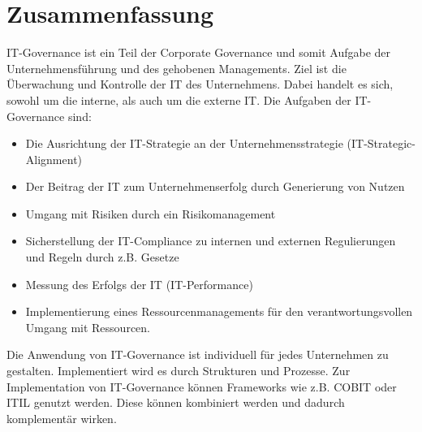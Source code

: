 \nopagebreak
\section{Zusammenfassung}

IT-Governance ist ein Teil der Corporate Governance und somit Aufgabe der Unternehmensführung und des gehobenen Managements. Ziel ist die Überwachung und Kontrolle der IT des Unternehmens. Dabei handelt es sich, sowohl um die interne, als auch um die externe IT. 
Die Aufgaben der IT-Governance sind:
\begin{itemize}
	\item Die Ausrichtung der IT-Strategie an der Unternehmensstrategie (IT-Strategic-Alignment)
	\item Der Beitrag der IT zum Unternehmenserfolg durch Generierung von Nutzen
	\item Umgang mit Risiken durch ein Risikomanagement
	\item Sicherstellung der IT-Compliance zu internen und externen Regulierungen und Regeln durch z.B. Gesetze
	\item Messung des Erfolgs der IT (IT-Performance)
	\item Implementierung eines Ressourcenmanagements für den verantwortungsvollen Umgang mit Ressourcen.
\end{itemize}

Die Anwendung von IT-Governance ist individuell für jedes Unternehmen zu gestalten. Implementiert wird es durch Strukturen und Prozesse. Zur Implementation von IT-Governance können Frameworks wie z.B. COBIT oder ITIL genutzt werden. Diese können kombiniert werden und dadurch komplementär wirken. 
